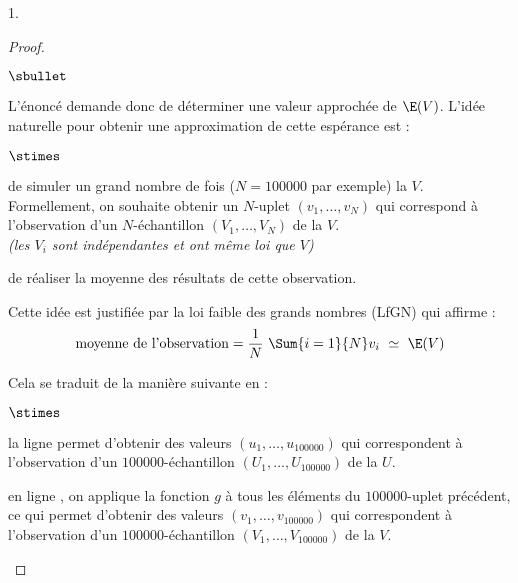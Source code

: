 \begin{noliste}{1.}
\begin{proof}
\begin{noliste}{$\sbullet$}
    \item L'énoncé demande donc de déterminer une valeur approchée de
      $\E(V)$. L'idée naturelle pour obtenir une approximation de
      cette espérance est :
      \begin{noliste}{$\stimes$}
      \item de simuler un grand nombre de fois ($N = 100 000$ par
        exemple) la \var $V$.\\
        Formellement, on souhaite obtenir un $N$-uplet $(v_1, \ldots,
        v_N)$ qui correspond à l'observation d'un $N$-échantillon
        $(V_1, \ldots, V_N)$ de la \var $V$.\\
        {\it (les \var $V_i$ sont indépendantes et ont même loi que
          $V$)}
      \item de réaliser la moyenne des résultats de cette observation.
      \end{noliste}
      Cette idée est justifiée par la loi faible des grands nombres
      (LfGN) qui affirme :
      \[
      \mbox{moyenne de l'observation} = \dfrac{1}{N} \ \Sum{i = 1}{N}
      v_i \ \simeq \ \E(V)
      \]

    \item Cela se traduit de la manière suivante en \Scilab{} :
      \begin{noliste}{$\stimes$}
      \item la ligne  permet d'obtenir des valeurs $(u_1,
        \ldots, u_{100 000})$ qui correspondent à l'observation d'un
        $100 000$-échantillon $(U_1, \ldots, U_{100 000})$ de la \var
        $U$.

      \item en ligne , on applique la fonction $g$ à tous les
        éléments du $100 000$-uplet précédent, ce qui permet d'obtenir
        des valeurs $(v_1, \ldots, v_{100 000})$ qui correspondent à
        l'observation d'un $100 000$-échantillon $(V_1, \ldots, V_{100
          000})$ de la \var $V$.


\end{noliste}
\end{noliste}
\end{proof}
\end{noliste}
